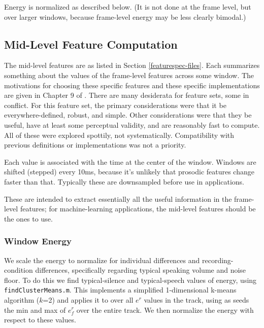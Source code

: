 \documentclass[11pt]{article}
\begin{document}
Energy is normalized as described below. (It is not done at the frame
level, but over larger windows, because  frame-level
energy may be less clearly bimodal.)


\subsection{Mid-Level Feature Computation}   \label{other-features}

The mid-level features are as listed in Section
\ref{featurespec-files}.  Each summarizes something about the values
of the frame-level features across some window.  The motivations for
choosing these specific features and these specific implementations
are given in Chapter 9 of \cite{me-cup}.  There are many desiderata
for feature sets, some in conflict.  For this feature set, the primary
considerations were that it be everywhere-defined, robust, and simple.
Other considerations were that they be useful, have at least some
perceptual validity, and are reasonably fast to compute.  All of these
were explored spottily, not systematically.  Compatibility with
previous definitions or implementations was not a priority.

Each value is associated with the time at the center of the window.
Windows are shifted (stepped) every 10ms, because it's unlikely that
prosodic features change faster than that.  Typically these are
downsampled before use in applications.

These are intended to extract essentially all the useful information
in the frame-level features; for machine-learning applications, the
mid-level features should be the ones to use. 


\subsubsection{Window Energy}

We scale the energy to normalize for individual differences and
recording-condition differences, specifically regarding typical
speaking volume and noise floor.  To do this we find typical-silence
and typical-speech values of energy, using {\tt findClusterMeans.m}.
This implements a simplified 1-dimensional k-means algorithm ($k$=2)
and applies it to over all $e^r$ values in the track, using as seeds
the min and max of $e_f^r$ over the entire track.  We then normalize
the energy with respect to these values.
\end{document}
